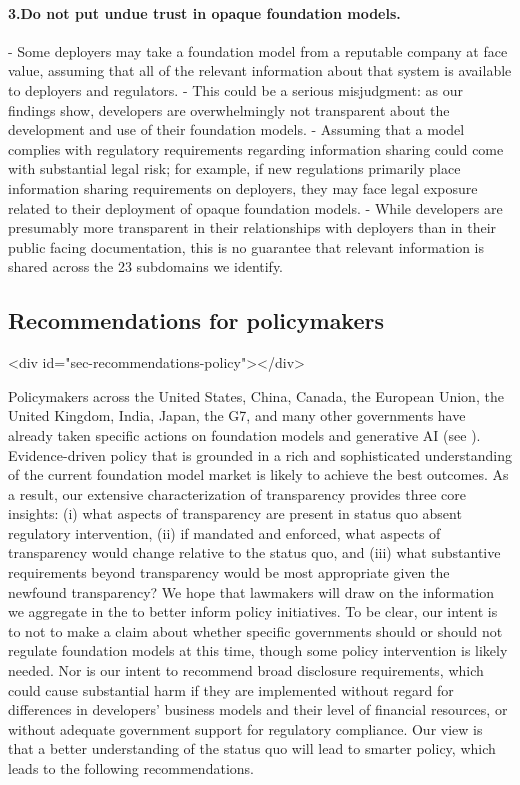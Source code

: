 \documentclass[screen, authorversion, acmsmall]{acmart}
\begin{document}
 \paragraph{3.\phantom{X}Do not put undue trust in opaque foundation models.} 
-  Some deployers may take a foundation model from a reputable company at face value, assuming that all of the relevant information about that system is available to deployers and regulators.
- This could be a serious misjudgment: as our findings show, developers are overwhelmingly not transparent about the development and use of their foundation models.
- Assuming that a model complies with regulatory requirements regarding information sharing could come with substantial legal risk; for example, if new regulations primarily place information sharing requirements on deployers, they may face legal exposure related to their deployment of opaque foundation models.
- While developers are presumably more transparent in their relationships with deployers than in their public facing documentation, this is no guarantee that relevant information is shared across the 23 subdomains we identify.
\clearpage
\hypertarget{recommendations-policy}{\subsection{Recommendations for policymakers}}
<div id="sec-recommendations-policy"></div>


Policymakers across the United States, China, Canada, the European Union, the United Kingdom, India, Japan, the G7, and many other governments have already taken specific actions on foundation models and generative AI (see ).
Evidence-driven policy that is grounded in a rich and sophisticated understanding of the current foundation model market is likely to achieve the best outcomes.
As a result, our extensive characterization of transparency provides three core insights: (i) what aspects of transparency are present in status quo absent regulatory intervention, (ii) if mandated and enforced, what aspects of transparency would change relative to the status quo, and (iii) what substantive requirements beyond transparency would be most appropriate given the newfound transparency?
We hope that lawmakers will draw on the information we aggregate in the \projectname to better inform policy initiatives.
To be clear, our intent is to not to make a claim about whether specific governments should or should not regulate foundation models at this time, though some policy intervention is likely needed. 
Nor is our intent to recommend broad disclosure requirements, which could cause substantial harm if they are implemented without regard for differences in developers' business models and their level of financial resources, or without adequate government support for regulatory compliance.
Our view is that a better understanding of the status quo will lead to smarter policy, which leads to the following recommendations.
\end{document}
